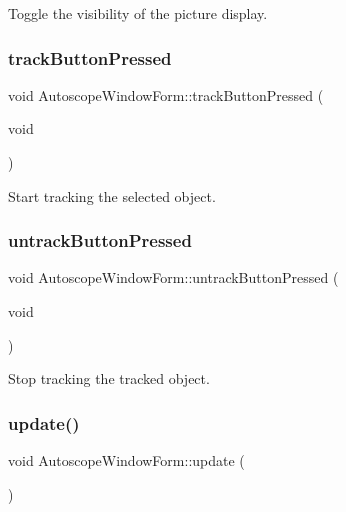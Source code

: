 Toggle the visibility of the picture display. 

\mbox{\label{class_autoscope_window_form_ad7b04807a37c5014ab3a151d2ce720b7}} 
\subsubsection{\texorpdfstring{trackButtonPressed}{trackButtonPressed}}
{\footnotesize\ttfamily void Autoscope\+Window\+Form\+::track\+Button\+Pressed (\begin{DoxyParamCaption}\item[{void}]{ }\end{DoxyParamCaption})\hspace{0.3cm}{\ttfamily [slot]}}



Start tracking the selected object. 

\mbox{\label{class_autoscope_window_form_a867b2e9355138f8b41c17dba563c43ef}} 
\subsubsection{\texorpdfstring{untrackButtonPressed}{untrackButtonPressed}}
{\footnotesize\ttfamily void Autoscope\+Window\+Form\+::untrack\+Button\+Pressed (\begin{DoxyParamCaption}\item[{void}]{ }\end{DoxyParamCaption})\hspace{0.3cm}{\ttfamily [slot]}}



Stop tracking the tracked object. 

\mbox{\label{class_autoscope_window_form_a732f751b8de766e03f5f79a7a08db136}} 
\subsubsection{\texorpdfstring{update()}{update()}}
{\footnotesize\ttfamily void Autoscope\+Window\+Form\+::update (\begin{DoxyParamCaption}{ }\end{DoxyParamCaption})}



